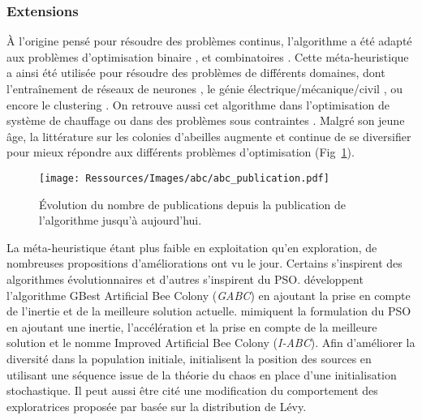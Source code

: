 \subsubsection{Extensions} %
\label{ssub:extensions}
À l’origine pensé pour résoudre des problèmes continus, l’algorithme a été adapté aux problèmes
d’optimisation binaire \parencite{Kashan2012342}, et combinatoires \parencite{Karaboga20113021}.
Cette méta-heuristique a ainsi été utilisée pour résoudre des problèmes de différents
domaines, dont l’entraînement de réseaux de neurones \parencite{Karaboga2007},
le génie électrique/mécanique/civil \parencite{Rao2009887}, ou encore le
clustering \parencite{Zhang20104761}. On retrouve aussi cet algorithme dans l’optimisation
de système de chauffage \parencite{Atashkari2011} ou dans des problèmes sous
contraintes \parencite{Tsai201480,Karaboga20113021}. Malgré son jeune âge, la littérature
sur les colonies d’abeilles augmente et continue de se diversifier pour mieux répondre
aux différents problèmes d’optimisation (Fig~\ref{fig:abc_publication}).

\begin{figure}
    \begin{center}
        \texttt{[image: Ressources/Images/abc/abc\_publication.pdf]}
    \end{center}
    \caption{Évolution du nombre de publications depuis la publication de l’algorithme
             jusqu’à aujourd’hui.
             \label{fig:abc_publication}}
\end{figure}

La méta-heuristique étant plus faible en exploitation qu’en exploration, de nombreuses
propositions d’améliorations ont vu le jour. Certains s’inspirent des algorithmes
évolutionnaires \parencite{Bi2011174,Zhao2010558} et d’autres s’inspirent du PSO.
\textcite{Zhu20103166} développent l’algorithme GBest Artificial Bee Colony (\textit{GABC}) en
ajoutant la prise en compte de l’inertie et de la meilleure solution actuelle.
\textcite{Li2012320} mimiquent la formulation du PSO en ajoutant une inertie, l’accélération et la prise
en compte de la meilleure solution et le nomme Improved Artificial Bee Colony (\textit{I-ABC}).
Afin d’améliorer la diversité dans la population initiale, \textcite{Xiang20131256}
initialisent la position des sources en utilisant une séquence issue de la théorie
du chaos en place d’une initialisation stochastique. Il peut aussi être cité
une modification du comportement des exploratrices proposée par \textcite{Sharma2012213}
basée sur la distribution de Lévy.

